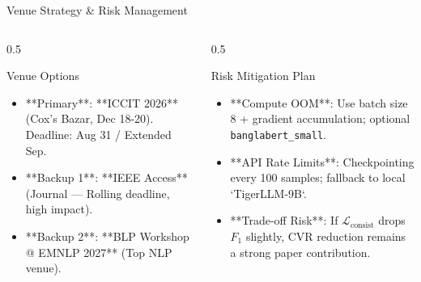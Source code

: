 \documentclass[10pt, aspectratio=169]{beamer}
\begin{document}
\begin{frame}{Venue Strategy \& Risk Management}
    \begin{columns}
        \begin{column}{0.5\textwidth}
            \begin{block}{Venue Options}
                \begin{itemize}
                    \item **Primary**: **ICCIT 2026** (Cox's Bazar, Dec 18-20). Deadline: Aug 31 / Extended Sep.
                    \item **Backup 1**: **IEEE Access** (Journal — Rolling deadline, high impact).
                    \item **Backup 2**: **BLP Workshop @ EMNLP 2027** (Top NLP venue).
                \end{itemize}
            \end{block}
        \end{column}

        \begin{column}{0.5\textwidth}
            \begin{block}{Risk Mitigation Plan}
                \begin{itemize}
                    \item **Compute OOM**: Use batch size 8 + gradient accumulation; optional \texttt{banglabert\_small}.
                    \item **API Rate Limits**: Checkpointing every 100 samples; fallback to local `TigerLLM-9B`.
                    \item **Trade-off Risk**: If $\mathcal{L}_{\text{consist}}$ drops $F_1$ slightly, CVR reduction remains a strong paper contribution.
                \end{itemize}
            \end{block}
        \end{column}
    \end{columns}
\end{frame}
\end{document}
